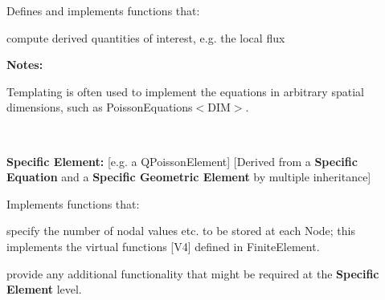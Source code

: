 \begin{center}
\begin{TabularC}{1}
\begin{TabularC}{2}
\begin{DoxyItemize}
\begin{DoxyItemize}
\end{DoxyItemize}
\end{DoxyItemize}
\begin{DoxyItemize}
\item Defines and implements functions that\-:
\begin{DoxyItemize}
\item compute derived quantities of interest, e.\-g. the local flux
\end{DoxyItemize}
\end{DoxyItemize}{\bfseries Notes\-:}
\begin{DoxyItemize}
\item Templating is often used to implement the equations in arbitrary spatial dimensions, such as {\ttfamily Poisson\-Equations$<$\-D\-I\-M$>$}.   
\end{DoxyItemize}\\
\end{TabularC}
\begin{center} \begin{TabularC}{1}
\hline
\begin{center} {\bfseries Specific Element\-:} \mbox{[}e.\-g. a {\ttfamily Q\-Poisson\-Element}\mbox{]} \newline
 \mbox{[}Derived from a {\bfseries Specific Equation } and a {\bfseries Specific Geometric Element} by multiple inheritance\mbox{]} \end{center}  


\begin{DoxyItemize}
\item Implements functions that\-:
\begin{DoxyItemize}
\item specify the number of nodal values etc. to be stored at each {\ttfamily Node}; this implements the virtual functions \mbox{[}V4\mbox{]} defined in {\ttfamily Finite\-Element}.
\item provide any additional functionality that might be required at the {\bfseries Specific} {\bfseries Element} level. 
\end{DoxyItemize}
\end{DoxyItemize}\\
\end{TabularC}
\end{center} \\
\end{TabularC}
\end{center}  

\begin{center} \end{center} 

